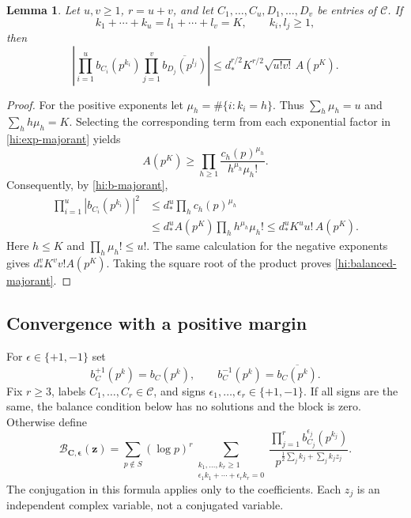 \documentclass[11pt,reqno]{amsart}
\numberwithin{equation}{section}
\newtheorem{lemma}[theorem]{Lemma}
\theoremstyle{definition}
\theoremstyle{remark}
\begin{document}
\begin{lemma}\label{hi:monomial-majorant}
Let $u,v\geq1$, $r=u+v$, and let $C_1,\ldots,C_u,D_1,\ldots,D_v$
be entries of $\mathcal C$.  If
\[
 k_1+\cdots+k_u=l_1+\cdots+l_v=K,\qquad k_i,l_j\geq1,
\]
then
\begin{equation}\label{hi:balanced-majorant}
 \left|\prod_{i=1}^u b_{C_i}(p^{k_i})
       \prod_{j=1}^v\overline{b_{D_j}(p^{l_j})}\right|
 \leq d_*^{r/2}K^{r/2}\sqrt{u!v!}\,A(p^K).
\end{equation}
\end{lemma}

\begin{proof}
For the positive exponents let $\mu_h=\#\{i:k_i=h\}$.  Thus
$\sum_h\mu_h=u$ and $\sum_hh\mu_h=K$.  Selecting the corresponding term
from each exponential factor in \eqref{hi:exp-majorant} yields
\[
 A(p^K)\geq\prod_{h\geq1}
 \frac{c_h(p)^{\mu_h}}{h^{\mu_h}\mu_h!}.
\]
Consequently, by \eqref{hi:b-majorant},
\begin{align*}
 \prod_{i=1}^u|b_{C_i}(p^{k_i})|^2
 &\leq d_*^u\prod_hc_h(p)^{\mu_h}\\
 &\leq d_*^u A(p^K)\prod_hh^{\mu_h}\mu_h!
 \leq d_*^uK^u u!\,A(p^K).
\end{align*}
Here $h\leq K$ and $\prod_h\mu_h!\leq u!$.  The same calculation for the
negative exponents gives $d_*^vK^v v!A(p^K)$.  Taking the square root of
the product proves \eqref{hi:balanced-majorant}.
\end{proof}

\subsection{Convergence with a positive margin}

For $\epsilon\in\{+1,-1\}$ set
\[
 b_C^{+1}(p^k)=b_C(p^k),\qquad
 b_C^{-1}(p^k)=\overline{b_C(p^k)}.
\]
Fix $r\geq3$, labels $C_1,\ldots,C_r\in\mathcal C$, and signs
$\epsilon_1,\ldots,\epsilon_r\in\{+1,-1\}$.  If all signs are the same,
the balance condition below has no solutions and the block is zero.
Otherwise define
\begin{equation}\label{hi:block}
 \mathcal B_{\boldsymbol C,\boldsymbol\epsilon}(\boldsymbol z)
 =\sum_{p\notin S}(\log p)^r
 \sum_{\substack{k_1,\ldots,k_r\geq1\\
                  \epsilon_1k_1+\cdots+\epsilon_rk_r=0}}
 \frac{\prod_{j=1}^r b_{C_j}^{\epsilon_j}(p^{k_j})}
 {p^{\frac12\sum_jk_j+\sum_jk_jz_j}}.
\end{equation}
The conjugation in this formula applies only to the coefficients.  Each
$z_j$ is an independent complex variable, not a conjugated variable.
\end{document}
